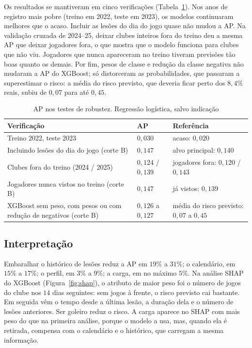 \documentclass[conference]{IEEEtran}
\begin{document}
Os resultados se mantiveram em cinco verificações (Tabela~\ref{tab:robustez}). Nos anos de registro mais pobre (treino em 2022, teste em 2023), os modelos continuaram melhores que o acaso. Incluir as lesões do dia do jogo quase não mudou a AP. Na validação cruzada de 2024--25, deixar clubes inteiros fora do treino deu a mesma AP que deixar jogadores fora, o que mostra que o modelo funciona para clubes que não viu. Jogadores que nunca apareceram no treino tiveram previsões tão boas quanto os demais. Por fim, pesos de classe e redução da classe negativa não mudaram a AP do XGBoost; só distorceram as probabilidades, que passaram a superestimar o risco: a média do risco previsto, que deveria ficar perto dos $8{,}4\%$ reais, subiu de $0{,}07$ para até $0{,}45$.

\begin{table}[!t]
\caption{AP nos testes de robustez. Regressão logística, salvo indicação}
\label{tab:robustez}
\centering
\footnotesize
\setlength{\tabcolsep}{3pt}
\begin{tabular}{>{\raggedright\arraybackslash}p{} >{\raggedright\arraybackslash}p{} >{\raggedright\arraybackslash}p{}}
\toprule
Verificação & AP & Referência \\
\midrule
Treino 2022, teste 2023 & $0{,}030$ & acaso: $0{,}020$ \\
Incluindo lesões do dia do jogo (corte B) & $0{,}147$ & alvo principal: $0{,}140$ \\
Clubes fora do treino (2024 / 2025) & $0{,}124$ / $0{,}139$ & jogadores fora: $0{,}120$ / $0{,}143$ \\
Jogadores nunca vistos no treino (corte B) & $0{,}147$ & já vistos: $0{,}139$ \\
XGBoost sem peso, com pesos ou com redução de negativos (corte B) & $0{,}126$ a $0{,}127$ & média do risco previsto: $0{,}07$ a $0{,}45$ \\
\bottomrule
\end{tabular}
\end{table}

\subsection{Interpretação}

Embaralhar o histórico de lesões reduz a AP em $19\%$ a $31\%$; o calendário, em $15\%$ a $17\%$; o perfil, em $3\%$ a $9\%$; a carga, em no máximo $5\%$. Na análise SHAP do XGBoost (Figura~\ref{fig:shap}), o atributo de maior peso foi o número de jogos do clube nos $14$ dias seguintes: sem jogos à frente, o risco previsto cai bastante. Em seguida vêm o tempo desde a última lesão, a duração dela e o número de lesões anteriores. Ser goleiro reduz o risco. A carga aparece no SHAP com mais peso do que na primeira análise, porque o modelo a usa, mas, quando ela é retirada, compensa com o calendário e o histórico, que carregam a mesma informação.
\end{document}
